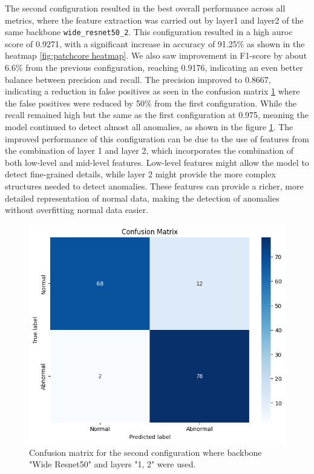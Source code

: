 The second configuration resulted in the best overall performance across all metrics, where the feature extraction was carried out by layer1 and layer2 of the same backbone \texttt{wide\_resnet50\_2}. This configuration resulted in a high \gls{auroc} score of 0.9271, with a significant increase in accuracy of 91.25\% as shown in the heatmap \ref{fig:patchcore heatmap}. We also saw improvement in F1-score by about 6.6\% from the previous configuration, reaching 0.9176, indicating an even better balance between precision and recall. The precision improved to 0.8667, indicating a reduction in false positives as seen in the confusion matrix \ref{fig:patchcore config2 confusion matrix} where the false positives were reduced by 50\% from the first configuration. While the recall remained high but the same as the first configuration at 0.975, meaning the model continued to detect almost all anomalies, as shown in the figure \ref{fig:patchcore config2 confusion matrix}. The improved performance of this configuration can be due to the use of features from the combination of layer 1 and layer 2, which incorporates the combination of both low-level and mid-level features. Low-level features might allow the model to detect fine-grained details, while layer 2 might provide the more complex structures needed to detect anomalies. These features can provide a richer, more detailed representation of normal data, making the detection of anomalies without overfitting normal data easier.

\begin{figure}[ht!]
    \centering
    \includegraphics[width=1\linewidth]{Rohit_Master_Thesis//Images/patchcore_config2_confusion_matrix.jpg}
    \caption{Confusion matrix for the second configuration where backbone "Wide Resnet50" and layers "1, 2" were used.}
    \label{fig:patchcore config2 confusion matrix}
\end{figure}

